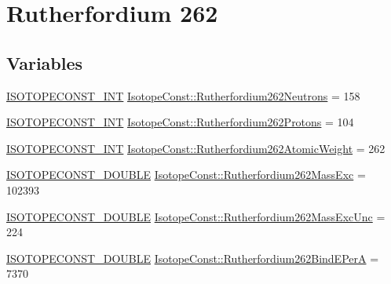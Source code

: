 \hypertarget{group___isotope_const-_rutherfordium-_rf262}{}\section{Rutherfordium 262}
\label{group___isotope_const-_rutherfordium-_rf262}
\subsection*{Variables}
\begin{DoxyCompactItemize}
\item 
\mbox{\hyperlink{group___isotope_const-_macros_ga5f18360b3e99483a35c32d789e62621c}{I\+S\+O\+T\+O\+P\+E\+C\+O\+N\+S\+T\+\_\+\+I\+NT}} \mbox{\hyperlink{group___isotope_const-_rutherfordium-_rf262_gae239dcb2dea76d765d9c0dad6e793565}{Isotope\+Const\+::\+Rutherfordium262\+Neutrons}} = 158
\item 
\mbox{\hyperlink{group___isotope_const-_macros_ga5f18360b3e99483a35c32d789e62621c}{I\+S\+O\+T\+O\+P\+E\+C\+O\+N\+S\+T\+\_\+\+I\+NT}} \mbox{\hyperlink{group___isotope_const-_rutherfordium-_rf262_ga10c9d89e4ed7ba4a2dd833dce5145159}{Isotope\+Const\+::\+Rutherfordium262\+Protons}} = 104
\item 
\mbox{\hyperlink{group___isotope_const-_macros_ga5f18360b3e99483a35c32d789e62621c}{I\+S\+O\+T\+O\+P\+E\+C\+O\+N\+S\+T\+\_\+\+I\+NT}} \mbox{\hyperlink{group___isotope_const-_rutherfordium-_rf262_ga98b69e1c2d0282d90726aa6ea8dd53b4}{Isotope\+Const\+::\+Rutherfordium262\+Atomic\+Weight}} = 262
\item 
\mbox{\hyperlink{group___isotope_const-_macros_ga8f45a7272ce02c0b4c65c44636ed719a}{I\+S\+O\+T\+O\+P\+E\+C\+O\+N\+S\+T\+\_\+\+D\+O\+U\+B\+LE}} \mbox{\hyperlink{group___isotope_const-_rutherfordium-_rf262_ga5627378594723b9a9016ae2cc2390154}{Isotope\+Const\+::\+Rutherfordium262\+Mass\+Exc}} = 102393
\item 
\mbox{\hyperlink{group___isotope_const-_macros_ga8f45a7272ce02c0b4c65c44636ed719a}{I\+S\+O\+T\+O\+P\+E\+C\+O\+N\+S\+T\+\_\+\+D\+O\+U\+B\+LE}} \mbox{\hyperlink{group___isotope_const-_rutherfordium-_rf262_gaaf7fbf5bcbf11cf0e00412c389f35a29}{Isotope\+Const\+::\+Rutherfordium262\+Mass\+Exc\+Unc}} = 224
\item 
\mbox{\hyperlink{group___isotope_const-_macros_ga8f45a7272ce02c0b4c65c44636ed719a}{I\+S\+O\+T\+O\+P\+E\+C\+O\+N\+S\+T\+\_\+\+D\+O\+U\+B\+LE}} \mbox{\hyperlink{group___isotope_const-_rutherfordium-_rf262_ga65f0583dd8b5d4a4f74ce896cab3015c}{Isotope\+Const\+::\+Rutherfordium262\+Bind\+E\+PerA}} = 7370

\end{DoxyCompactItemize}
